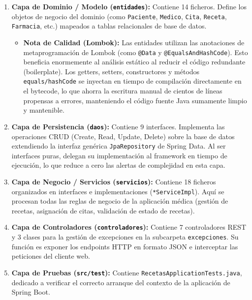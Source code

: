 \documentclass[12pt,a4paper]{article}
\begin{document}
\begin{enumerate}
    \item \textbf{Capa de Dominio / Modelo (\texttt{entidades}):} Contiene 14 ficheros. Define los objetos de negocio del dominio (como \texttt{Paciente}, \texttt{Medico}, \texttt{Cita}, \texttt{Receta}, \texttt{Farmacia}, etc.) mapeados a tablas relacionales de base de datos.
    \begin{itemize}
        \item \textbf{Nota de Calidad (Lombok):} Las entidades utilizan las anotaciones de metaprogramación de Lombok (como \texttt{@Data} y \texttt{@EqualsAndHashCode}). Esto beneficia enormemente al análisis estático al reducir el código redundante (boilerplate). Los getters, setters, constructores y métodos \texttt{equals/hashCode} se inyectan en tiempo de compilación directamente en el bytecode, lo que ahorra la escritura manual de cientos de líneas propensas a errores, manteniendo el código fuente Java sumamente limpio y mantenible.
    \end{itemize}
    \item \textbf{Capa de Persistencia (\texttt{daos}):} Contiene 9 interfaces. Implementa las operaciones CRUD (Create, Read, Update, Delete) sobre la base de datos extendiendo la interfaz genérica \texttt{JpaRepository} de Spring Data. Al ser interfaces puras, delegan su implementación al framework en tiempo de ejecución, lo que reduce a cero las alertas de complejidad en esta capa.
    \item \textbf{Capa de Negocio / Servicios (\texttt{servicios}):} Contiene 18 ficheros organizados en interfaces e implementaciones (\texttt{*ServiceImpl}). Aquí se procesan todas las reglas de negocio de la aplicación médica (gestión de recetas, asignación de citas, validación de estado de recetas).
    \item \textbf{Capa de Controladores (\texttt{controladores}):} Contiene 7 controladores REST y 3 clases para la gestión de excepciones en la subcarpeta \texttt{excepciones}. Su función es exponer los endpoints HTTP en formato JSON e interceptar las peticiones del cliente web.
    \item \textbf{Capa de Pruebas (\texttt{src/test}):} Contiene \texttt{RecetasApplicationTests.java}, dedicado a verificar el correcto arranque del contexto de la aplicación de Spring Boot.
\end{enumerate}

\newpage

\end{document}
